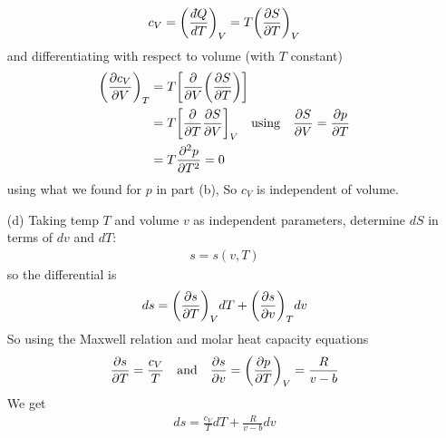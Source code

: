 \documentclass[../main.tex]{subfiles}
\begin{document}
\begin{enumerate}
    \begin{align*}
        c_V = \qt(\frac{\dbar Q}{dT})_V = T \qt(\pdv{S}{T})_V
    \end{align*}
    and differentiating with respect to volume (with $T$ constant)
    \begin{align*}
        \qt(\pdv{c_V}{V})_T &= T \qt[\pdv{V}\qt( \pdv{S}{T})] \\
        &= T \qt[\pdv{T} \pdv{S}{V}]_V \qusing \pdv{S}{V} = \pdv{p}{T} \\
        &= T \pdv[2]{p}{T} = 0
    \end{align*}
    using what we found for $p$ in part (b), So $c_V$ is independent of volume.
    \item [(d)] Taking temp $T$ and volume $v$ as independent parameters, determine $dS$ in terms of $dv$ and $dT$: 
    \begin{align*}
        s = s(v,T)
    \end{align*}
    so the differential is
    \begin{align*}
        ds = \qt(\pdv{s}{T})_V dT + \qt(\pdv{s}{v})_T dv
    \end{align*}
    So using the Maxwell relation and molar heat capacity equations
    \begin{align*}
        \pdv{s}{T} = \frac{c_V}{T} \qand \pdv{s}{v} = \qt(\pdv{p}{T})_V = \frac{R}{v - b}
    \end{align*}
    We get
    \begin{align*}
        \boxed{ds = \frac{c_V}{T} dT + \frac{R}{v - b} dv}
    \end{align*}
\end{enumerate}

\newpage
\end{document}
